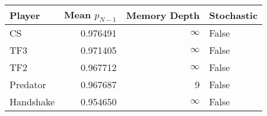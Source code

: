 \begin{tabular}{lrrl}
\toprule
    Player &  Mean $p_{N-1}$ &  Memory Depth & Stochastic \\
\midrule
        CS &        0.976491 &            \(\infty\) &      False \\
       TF3 &        0.971405 &            \(\infty\) &      False \\
       TF2 &        0.967712 &            \(\infty\) &      False \\
  Predator &        0.967687 &             9 &      False \\
 Handshake &        0.954650 &            \(\infty\) &      False \\
\bottomrule
\end{tabular}
